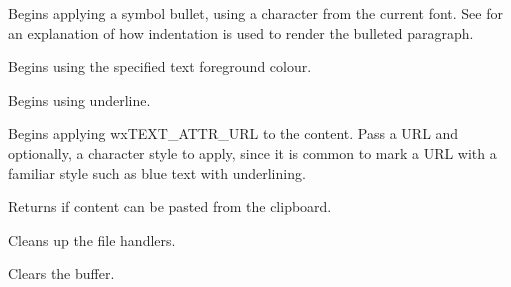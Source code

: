 Begins applying a symbol bullet, using a character from the current font. See  for
an explanation of how indentation is used to render the bulleted paragraph.

\label{wxrichtextbufferbegintextcolour}


Begins using the specified text foreground colour.

\label{wxrichtextbufferbeginunderline}


Begins using underline.

\label{wxrichtextbufferbeginurl}


Begins applying wxTEXT\_ATTR\_URL to the content. Pass a URL and optionally, a character style to apply,
since it is common to mark a URL with a familiar style such as blue text with underlining.

\label{wxrichtextbuffercanpastefromclipboard}


Returns \true if content can be pasted from the clipboard.

\label{wxrichtextbuffercleanuphandlers}


Cleans up the file handlers.

\label{wxrichtextbufferclear}


Clears the buffer.

\label{wxrichtextbufferclearliststyle}



